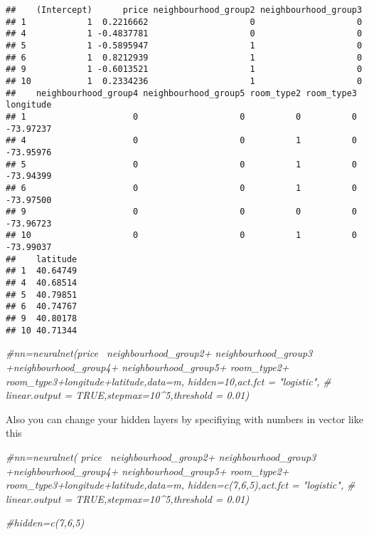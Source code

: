 \documentclass[
]{article}
\newenvironment{Shaded}{\begin{snugshade}}{\end{snugshade}}
\newcommand{\CommentTok}[1]{\textcolor[rgb]{0.56,0.35,0.01}{\textit{#1}}}
\begin{document}
\begin{verbatim}
##    (Intercept)      price neighbourhood_group2 neighbourhood_group3
## 1            1  0.2216662                    0                    0
## 4            1 -0.4837781                    0                    0
## 5            1 -0.5895947                    1                    0
## 6            1  0.8212939                    1                    0
## 9            1 -0.6013521                    1                    0
## 10           1  0.2334236                    1                    0
##    neighbourhood_group4 neighbourhood_group5 room_type2 room_type3 longitude
## 1                     0                    0          0          0 -73.97237
## 4                     0                    0          1          0 -73.95976
## 5                     0                    0          1          0 -73.94399
## 6                     0                    0          1          0 -73.97500
## 9                     0                    0          0          0 -73.96723
## 10                    0                    0          1          0 -73.99037
##    latitude
## 1  40.64749
## 4  40.68514
## 5  40.79851
## 6  40.74767
## 9  40.80178
## 10 40.71344
\end{verbatim}

\begin{Shaded}
\begin{Highlighting}[]
\CommentTok{#nn=neuralnet(price~ neighbourhood_group2+ neighbourhood_group3 +neighbourhood_group4+ neighbourhood_group5+ room_type2+ room_type3+longitude+latitude,data=m, hidden=10,act.fct = "logistic",}
\CommentTok{#             linear.output = TRUE,stepmax=10^5,threshold = 0.01)}
\end{Highlighting}
\end{Shaded}

Also you can change your hidden layers by specifiying with numbers in
vector like this

\begin{Shaded}
\begin{Highlighting}[]
\CommentTok{#nn=neuralnet( price~ neighbourhood_group2+ neighbourhood_group3 +neighbourhood_group4+ neighbourhood_group5+ room_type2+ room_type3+longitude+latitude,data=m, hidden=c(7,6,5),act.fct = "logistic",}
\CommentTok{#           linear.output = TRUE,stepmax=10^5,threshold = 0.01)}

\CommentTok{#hidden=c(7,6,5)}
\end{Highlighting}
\end{Shaded}
\end{document}
